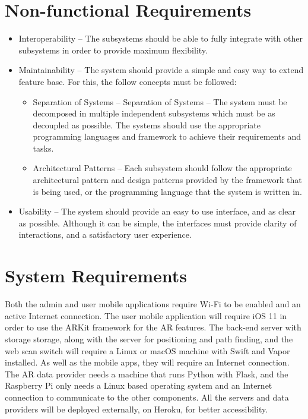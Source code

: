 \section{Non-functional Requirements}
\label{sec:non-functional-reqs}
\begin{itemize}
    \item Interoperability – The subsystems should be able to fully integrate with other subsystems in order to provide maximum flexibility.
    \item Maintainability – The system should provide a simple and easy way to extend feature base. For this, the follow concepts must be followed:
        \begin{itemize}
            \item Separation of Systems – Separation of Systems – The system must be decomposed in multiple independent subsystems which must be as decoupled as possible. The systems should use the appropriate programming languages and framework to achieve their requirements and tasks.
            \item Architectural Patterns – Each subsystem should follow the appropriate architectural pattern and design patterns provided by the framework that is being used, or the programming language that the system is written in.
        \end{itemize}
    \item Usability – The system should provide an easy to use interface, and as clear as possible. Although it can be simple, the interfaces must provide clarity of interactions, and a satisfactory user experience.
\end{itemize}

\section{System Requirements}
\label{sec:system-requirements}
Both the admin and user mobile applications require Wi-Fi to be enabled and an active Internet connection. The user mobile application will require iOS 11 in order to use the ARKit framework for the AR features. The back-end server with storage storage, along with the server for positioning and path finding, and the web scan switch will require a Linux or macOS machine with Swift and Vapor installed. As well as the mobile apps, they will require an Internet connection. The AR data provider needs a machine that runs Python with Flask, and the Raspberry Pi only needs a Linux based operating system and an Internet connection to communicate to the other components. All the servers and data providers will be deployed externally, on Heroku, for better accessibility. 

